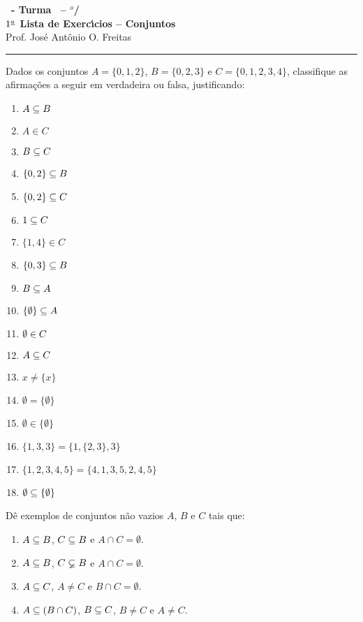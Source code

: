 \documentclass[12pt]{exam}
\begin{document}
\begin{center}
{\Large\bf \disciplina\ - Turma \turma\ -- \semestre$^{o}$/\ano} \\ \vspace{9pt} {\large\bf
  $1^{\underline{a}}$ Lista de Exerc{\'\i}cios -- Conjuntos}\\ \vspace{9pt} Prof. Jos{\'e} Ant{\^o}nio O. Freitas
\end{center}
\hrule


\vspace{.6cm}

\questao{} Dados os conjuntos $A = \{0,1,2\}$, $B = \{0,2,3\}$ e $C = \{0,1,2,3,4\}$, classifique as afirma\c{c}\~oes a seguir em verdadeira ou falsa, justificando:
\begin{multicols}{2}
	\begin{enumerate}[label={\alph*})]
		\item $A \subseteq B$
		\item $A \in C$
		\item $B \subseteq C$
		\item $\{0,2\} \subseteq B$
		\item $\{0,2\} \subseteq C$
		\item $1 \subseteq C$
		\item $\{1,4\} \in C$
		\item $\{0,3\} \subseteq B$
		\item $B \subseteq A$
		\item $\{\emptyset\} \subseteq A$
		\item $\emptyset \in C$
		\item $A \subseteq C$
		\item $x \neq \{x\}$
		\item $\emptyset = \{\emptyset\}$
		\item $\emptyset \in \{\emptyset\}$
		\item $\{1, 3, 3\} = \{1, \{2, 3\}, 3\}$
		\item $\{1, 2, 3, 4, 5\} = \{4, 1, 3, 5, 2, 4, 5\}$
		\item $\emptyset \subseteq \{\emptyset\}$
	\end{enumerate}	
\end{multicols}

\questao{} D\^e exemplos de conjuntos n\~ao vazios $A$, $B$ e $C$ tais que:
\begin{enumerate}[label={\alph*})]
	\item $A \subseteq B$, $C \subseteq B$ e $A \cap C = \emptyset$.
	\item $A \subseteq B$, $C \varsubsetneq B$ e $A \cap C = \emptyset$.
	\item $A \subseteq C$, $A \ne C$ e $B \cap C = \emptyset$.
	\item $A \subseteq (B \cap C)$, $B \subseteq C$, $B \ne C$ e $A \ne C$.
\end{enumerate}
\end{document}
